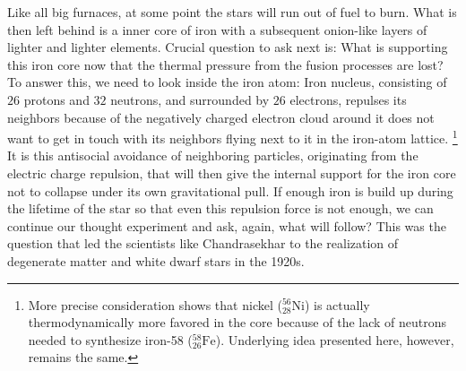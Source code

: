 Like all big furnaces, at some point the stars will run out of fuel to burn.
What is then left behind is a inner core of iron with a subsequent onion-like layers of lighter and lighter elements.
Crucial question to ask next is: 
What is supporting this iron core now that the thermal pressure from the fusion processes are lost?
To answer this, we need to look inside the iron atom:
Iron nucleus, consisting of $26$ protons and $32$ neutrons, and surrounded by $26$ electrons, repulses its neighbors because of the negatively charged electron cloud around it does not want to get in touch with its neighbors flying next to it in the iron-atom lattice.
\footnote{More precise consideration shows that nickel ($^{56}_{28}\mathrm{Ni}$) is actually thermodynamically more favored in the core because of the lack of neutrons needed to synthesize iron-58 ($^{58}_{26}\mathrm{Fe}$).
Underlying idea presented here, however, remains the same.
}
It is this antisocial avoidance of neighboring particles, originating from the electric charge repulsion, that will then give the internal support for the iron core not to collapse under its own gravitational pull.
If enough iron is build up during the lifetime of the star so that even this repulsion force is not enough, we can continue our thought experiment and ask, again, what will follow?
This was the question that led the scientists like Chandrasekhar to the realization of degenerate matter and white dwarf stars in the 1920s.

